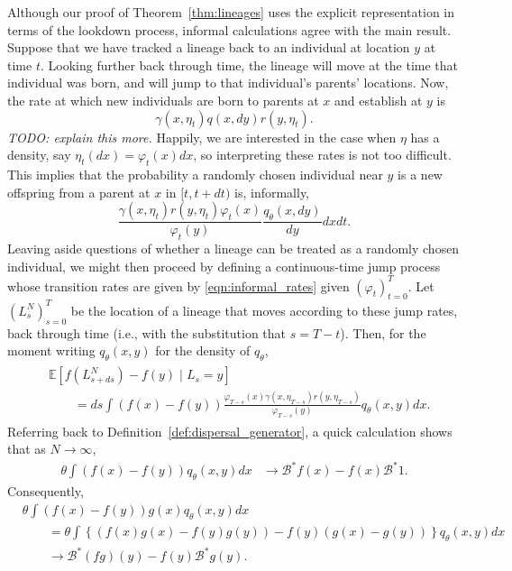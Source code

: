 \documentclass[12pt]{article}
\newcommand{\IE}{\mathbb E}
\newcommand{\DG}{\mathcal{B}}  %
\newcommand{\comment}[1]{{\color{blue} \it #1}}
\begin{document}
Although our proof of Theorem~\ref{thm:lineages}
uses the explicit representation in terms of the lookdown process,
informal calculations agree with the main result.
Suppose that we have tracked a lineage back to an individual at location $y$ at time $t$.
Looking further back through time, the lineage will move at the time that individual was born,
and will jump to that individual's parents' locations.
Now, the rate at which new individuals are born to parents at $x$ and establish at $y$
is
$$
    \gamma(x, \eta_t) q(x, dy) r(y, \eta_t) .
$$
\comment{TODO: explain this more.}
Happily, we are interested in the case when $\eta$ has a density,
say $\eta_t(dx) = \varphi_t(x) dx$,
so interpreting these rates is not too difficult.
This implies that the probability a randomly chosen individual near $y$
is a new offspring from a parent at $x$ in $[t, t+dt)$ is, informally,
\begin{equation} \label{eqn:informal_rates}
\frac{
    \gamma(x, \eta_t) r(y, \eta_t) \varphi_t(x)
}{
    \varphi_t(y)
} \frac{ q_\theta(x, dy) }{ dy } dx dt .
\end{equation}
Leaving aside questions of whether a lineage can be treated as a randomly chosen individual,
we might then proceed by defining a continuous-time jump process
whose transition rates are given by \eqref{eqn:informal_rates} given $(\varphi_t)_{t=0}^T$.
Let $(L^N_s)_{s=0}^T$ be the location of a lineage that moves according to these jump rates,
back through time (i.e., with the substitution that $s = T-t$).
Then, for the moment writing $q_\theta(x, y)$ for the density of $q_\theta$,
\begin{align} \label{eqn:lineage_generator_Edt}
    \begin{split}
    &\IE[f(L^N_{s+ds}) - f(y) \;|\; L_s = y]
    \\&\qquad 
    =
    ds \int \left(f(x) - f(y)\right)
    \frac{
        \varphi_{T-s}(x) \gamma(x, \eta_{T-s}) r(y, \eta_{T-s})
    }{
        \varphi_{T-s}(y)
    }
    q_\theta(x, y) dx .
    \end{split}
\end{align}
Referring back to Definition~\ref{def:dispersal_generator},
a quick calculation shows that as $N \to \infty$,
\begin{align*}
    \theta \int (f(x) - f(y)) q_\theta(x, y) dx
    &\to
    \DG^* f(x)  - f(x) \DG^* 1 .
\end{align*}
Consequently,
\begin{align*}
    &
    \theta \int (f(x) - f(y)) g(x) q_\theta(x, y) dx \\
    &\qquad =
    \theta \int \left\{
        (f(x) g(x) - f(y) g(y)) - f(y) (g(x) - g(y))
    \right\} q_\theta(x, y) dx \\
    &\qquad \to
        \DG^*(fg)(y) - f(y) \DG^* g(y) . 
\end{align*}
\end{document}
